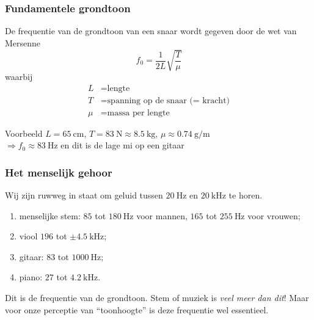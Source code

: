 \documentclass[compress, darktitle, framenumber, totalframenumber]{beamer}
\begin{document}
\begin{frame}
  \frametitle{Fundamentele grondtoon}

  De frequentie van de grondtoon van een snaar wordt gegeven door de \alert{wet van Mersenne}
  \begin{equation}
    f_0=\frac{1}{2L}\sqrt{\frac{T}{\mu}}
  \end{equation}
  waarbij
  \begin{equation}
    \begin{aligned}
      L&=\text{lengte} \\
      T&=\text{spanning op de snaar (= kracht)} \\
      \mu&=\text{massa per lengte}
    \end{aligned}
  \end{equation}
  \pause
  \begin{block}{Voorbeeld}
    $L=\SI{65}{\centi\meter}$, $T=\SI{83}{\newton}\approx\SI{8.5}{\kilo\gram}$, $\mu\approx\SI{0.74}{\gram\per\meter}$ \\
    $\Rightarrow f_0\approx\SI{83}{\hertz}$ en dit is de lage mi op een gitaar
  \end{block}
\end{frame}

\begin{frame}
  \frametitle{Het menselijk gehoor}

  Wij zijn ruwweg in staat om geluid tussen $\SI{20}{\hertz}$ en $\SI{20}{\kilo\hertz}$ te horen.
  \pause
  \begin{enumerate}
    \item menselijke stem: $85$ tot $\SI{180}{\hertz}$ voor mannen, $165$ tot $\SI{255}{\hertz}$ voor vrouwen;
    \item viool $196$ tot $\pm\SI{4.5}{\kilo\hertz}$;
    \item gitaar: $83$ tot $\SI{1000}{\hertz}$;
    \item piano: $27$ tot $\SI{4.2}{\kilo\hertz}$.
  \end{enumerate}
  \pause
  Dit is de frequentie van de \alert{grondtoon}. Stem of muziek is \emph{veel meer dan dit}! Maar voor onze perceptie van ``toonhoogte'' is deze frequentie wel essentieel.
\end{frame}
\end{document}
